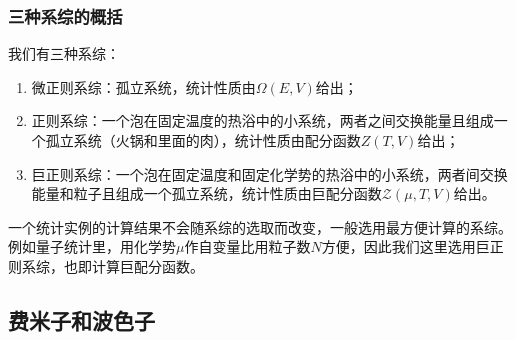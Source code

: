 \documentclass[a4paper,11pt]{ctexart}
\newcommand{\grandz}{\mathcal{Z}}
\begin{document}
\subsubsection{三种系综的概括}
我们有三种系综：
\begin{enumerate}
\item 微正则系综：孤立系统，统计性质由$\varOmega(E,V)$给出；
\item 正则系综：一个泡在固定温度的热浴中的小系统，两者之间交换能量且组成一个孤立系统（火锅和里面的肉），统计性质由配分函数$Z(T,V)$给出；
\item 巨正则系综：一个泡在固定温度和固定化学势的热浴中的小系统，两者间交换能量和粒子且组成一个孤立系统，统计性质由巨配分函数$\grandz (\mu,T,V)$给出。
\end{enumerate}
一个统计实例的计算结果不会随系综的选取而改变，一般选用最方便计算的系综。例如量子统计里，用化学势$\mu$作自变量比用粒子数$N$方便，因此我们这里选用巨正则系综，也即计算巨配分函数。
\subsection{费米子和波色子}
\end{document}
